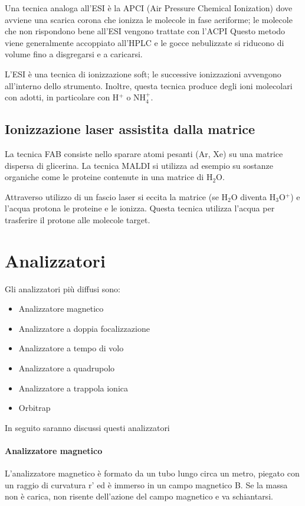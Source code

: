 Una tecnica analoga all'ESI è la APCI (Air Pressure Chemical Ionization) dove avviene una scarica corona che ionizza le molecole in fase aeriforme;
le molecole che non rispondono bene all'ESI vengono trattate con l'ACPI
Questo metodo viene generalmente accoppiato all’HPLC e le gocce nebulizzate si riducono di volume fino a disgregarsi e a caricarsi.

L'ESI è una tecnica di ionizzazione soft; le successive ionizzazioni avvengono all'interno dello strumento.
Inoltre, questa tecnica produce degli ioni molecolari con adotti, in particolare con H$^+$ o NH$_4^+$.

\subsection{Ionizzazione laser assistita dalla matrice}
La tecnica FAB consiste nello sparare atomi pesanti (Ar, Xe) su una matrice dispersa di glicerina.
La tecnica MALDI si utilizza ad esempio su sostanze organiche come le proteine contenute in una matrice di H$_2$O.

Attraverso utilizzo di un fascio laser si eccita la matrice (se H$_2$O diventa H$_3$O$^+$) e l'acqua protona le proteine e le ionizza.
Questa tecnica utilizza l'acqua per trasferire il protone alle molecole target.

\section{Analizzatori}
Gli analizzatori più diffusi sono:
\begin{itemize}
\item Analizzatore magnetico
\item Analizzatore a doppia focalizzazione
\item Analizzatore a tempo di volo
\item Analizzatore a quadrupolo
\item Analizzatore a trappola ionica
\item Orbitrap
\end{itemize}
In seguito saranno discussi questi analizzatori

\paragraph{Analizzatore magnetico}
L'analizzatore magnetico è formato da un tubo lungo circa un metro, piegato con un raggio di curvatura r' ed è immerso in un campo magnetico B.
Se la massa non è carica, non risente dell'azione del campo magnetico e va schiantarsi.

